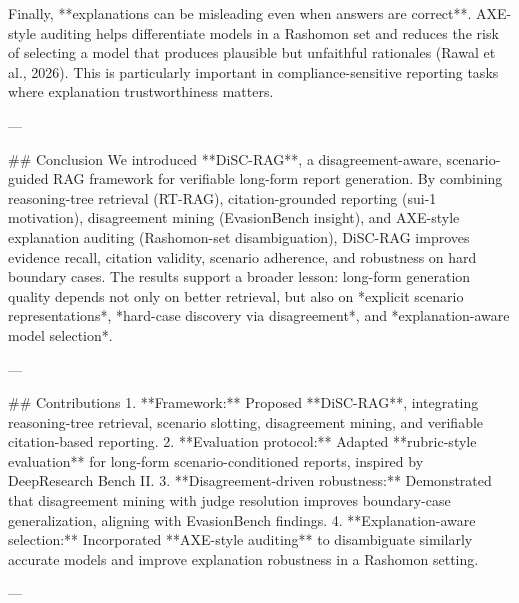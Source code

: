 Finally, **explanations can be misleading even when answers are correct**. AXE-style auditing helps differentiate models in a Rashomon set and reduces the risk of selecting a model that produces plausible but unfaithful rationales (Rawal et al., 2026). This is particularly important in compliance-sensitive reporting tasks where explanation trustworthiness matters.

---

## Conclusion  
We introduced **DiSC-RAG**, a disagreement-aware, scenario-guided RAG framework for verifiable long-form report generation. By combining reasoning-tree retrieval (RT-RAG), citation-grounded reporting (sui-1 motivation), disagreement mining (EvasionBench insight), and AXE-style explanation auditing (Rashomon-set disambiguation), DiSC-RAG improves evidence recall, citation validity, scenario adherence, and robustness on hard boundary cases. The results support a broader lesson: long-form generation quality depends not only on better retrieval, but also on *explicit scenario representations*, *hard-case discovery via disagreement*, and *explanation-aware model selection*.

---

## Contributions  
1. **Framework:** Proposed **DiSC-RAG**, integrating reasoning-tree retrieval, scenario slotting, disagreement mining, and verifiable citation-based reporting.  
2. **Evaluation protocol:** Adapted **rubric-style evaluation** for long-form scenario-conditioned reports, inspired by DeepResearch Bench II.  
3. **Disagreement-driven robustness:** Demonstrated that disagreement mining with judge resolution improves boundary-case generalization, aligning with EvasionBench findings.  
4. **Explanation-aware selection:** Incorporated **AXE-style auditing** to disambiguate similarly accurate models and improve explanation robustness in a Rashomon setting.  

---